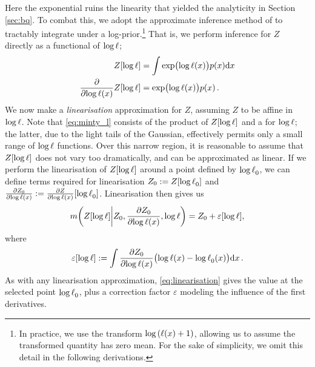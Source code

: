\documentclass{article}
\begin{document}
Here the exponential ruins the linearity that yielded the analyticity in Section \ref{sec:bq}. To combat this, we adopt the approximate inference method of \citet{BQR} to tractably integrate under a log-\gpb prior.\footnote{In practice, we use the transform 
$\log\left(\lfn(\lfv) + 1\right)$, allowing us to assume the transformed quantity has zero mean. For the sake of simplicity, we omit this detail in the following derivations.} That is, we perform inference for $Z$ directly as a functional of $\tr$;
%
\begin{align}
 Z[\tr] & = \int \exp \bigl( \tr(\lfv)\bigr) p(\lfv) \ud \lfv\\
\pderiv{}{\tr(\lfv)}Z[\tr] & = \exp \bigl( \tr(\lfv)\bigr) p(\lfv) %
\,.
\end{align}
%
We now make a \emph{linearisation} approximation
for $Z$, assuming $Z$ to be affine in $\tr$. 
Note that \eqref{eq:minty_l} consists of the product of $Z[\tr]$ and a \gpb for $\tr$; the latter, due to the light tails of the Gaussian, effectively permits only a small range of $\tr$ functions. Over this narrow region, it is reasonable to assume that $Z[\tr]$ does not vary too dramatically, and can be approximated as linear. If we perform the linearisation of $Z[\tr]$ around a point defined by $\tr_0$, we can define terms required for linearisation
$Z_0 \deq Z[\tr_0]$ and $\pderiv{Z_0}{\tr(\lfv)} \deq \pderiv{Z}{\tr(\lfv)}[\tr_0]$.  Linearisation then gives us
\begin{equation}\label{eq:linearisation}
\novmean{Z[\tr]}{Z_0,\pderiv{Z_0}{\tr(\lfv)}, \tr} 
= Z_0+\varepsilon[\tr],
\end{equation}
where
\begin{equation} \label{eq:correction}
\varepsilon[\tr] \deq \int \pderiv{Z_0}{\tr(\lfv)}\bigl(\tr(\lfv)-\tr_0(\lfv)\bigr)\ud\lfv\,.
\end{equation}
As with any linearisation approximation, \eqref{eq:linearisation} gives the value at the selected point $\tr_0$, plus a correction factor $\varepsilon$ modeling the influence of the first derivatives.
\end{document}
